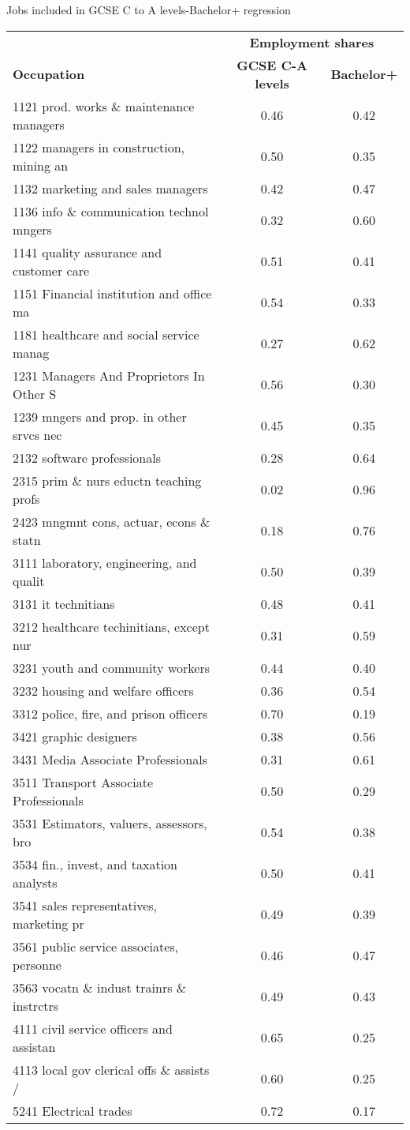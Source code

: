 \begin{threeparttable}[h!]
	\caption{Jobs included in GCSE C to A levels-Bachelor+ regression}
		\centering
	\begin{tabular}{lcc}
	\toprule
	\toprule
	&\multicolumn{2}{c}{\textbf{Employment shares}}\\
	\textbf{Occupation}&\textbf{ GCSE C-A levels}&\textbf{Bachelor+}\\
\hline
1121 prod. works \& maintenance managers&0.46&0.42 \\
1122 managers in construction, mining an&0.50&0.35 \\
1132 marketing and sales managers&0.42&0.47 \\
1136 info \& communication technol mngers&0.32&0.60 \\
1141 quality assurance and customer care&0.51&0.41 \\
1151 Financial institution and office ma&0.54&0.33 \\
1181 healthcare and social service manag&0.27&0.62 \\
1231 Managers And Proprietors In Other S&0.56&0.30 \\
1239 mngers and prop. in other srvcs nec&0.45&0.35 \\
2132 software professionals&0.28&0.64 \\
2315 prim \& nurs eductn teaching profs&0.02&0.96 \\
2423 mngmnt cons, actuar, econs \& statn&0.18&0.76 \\
3111 laboratory, engineering, and qualit&0.50&0.39 \\
3131 it technitians&0.48&0.41 \\
3212 healthcare techinitians, except nur&0.31&0.59 \\
3231 youth and community workers&0.44&0.40 \\
3232 housing and welfare officers&0.36&0.54 \\
3312 police, fire, and prison officers&0.70&0.19 \\
3421 graphic designers&0.38&0.56 \\
3431 Media Associate Professionals&0.31&0.61 \\
3511 Transport Associate Professionals&0.50&0.29 \\
3531 Estimators, valuers, assessors, bro&0.54&0.38 \\
3534 fin., invest, and taxation analysts&0.50&0.41 \\
3541 sales representatives, marketing pr&0.49&0.39 \\
3561 public service associates, personne&0.46&0.47 \\
3563 vocatn \& indust trainrs \& instrctrs&0.49&0.43 \\
4111 civil service officers and assistan&0.65&0.25 \\
4113 local gov clerical offs \& assists /&0.60&0.25 \\
5241 Electrical trades&0.72&0.17 \\
\bottomrule
\bottomrule
\end{tabular}
\end{threeparttable}
